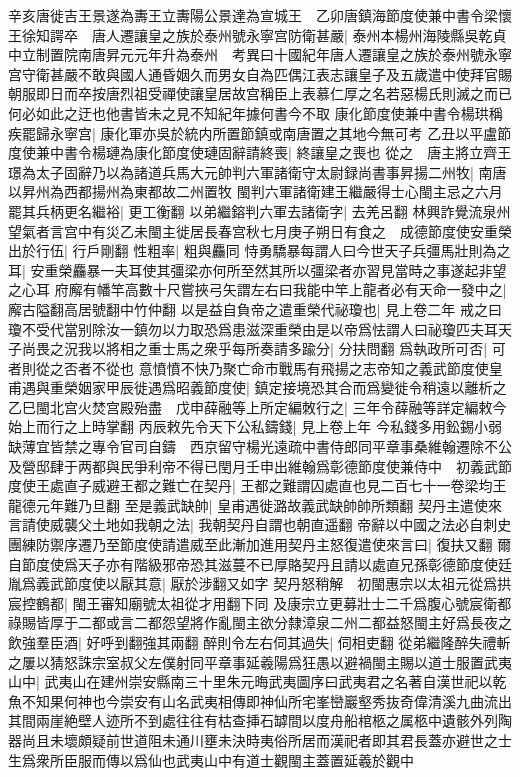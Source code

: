 辛亥唐徙吉王景遂為夀王立夀陽公景達為宣城王　乙卯唐鎮海節度使兼中書令梁懷王徐知諤卒　唐人遷讓皇之族於泰州號永寧宫防衛甚嚴|{
	泰州本楊州海陵縣吳乾貞中立制置院南唐昇元元年升為泰州　考異曰十國紀年唐人遷讓皇之族於泰州號永寧宫守衛甚嚴不敢與國人通昏姻久而男女自為匹偶江表志讓皇子及五歲遣中使拜官賜朝服即日而卒按唐烈祖受禪使讓皇居故宫稱臣上表慕仁厚之名若惡楊氏則滅之而已何必如此之迂也他書皆未之見不知紀年據何書今不取}
康化節度使兼中書令楊珙稱疾罷歸永寧宫|{
	康化軍亦吳於統内所置節鎮或南唐置之其地今無可考}
乙丑以平盧節度使兼中書令楊璉為康化節度使璉固辭請終喪|{
	終讓皇之喪也}
從之　唐主將立齊王璟為太子固辭乃以為諸道兵馬大元帥判六軍諸衛守太尉録尚書事昇揚二州牧|{
	南唐以昇州為西都揚州為東都故二州置牧}
閩判六軍諸衛建王繼嚴得士心閩主忌之六月罷其兵柄更名繼裕|{
	更工衡翻}
以弟繼鎔判六軍去諸衛字|{
	去羌呂翻}
林興詐覺流泉州望氣者言宫中有災乙未閩主徙居長春宫秋七月庚子朔日有食之　成德節度使安重榮出於行伍|{
	行戶剛翻}
性粗率|{
	粗與麤同}
恃勇驕暴每謂人曰今世天子兵彊馬壯則為之耳|{
	安重榮麤暴一夫耳使其彊梁亦何所至然其所以彊梁者亦習見當時之事遂起非望之心耳}
府廨有幡竿高數十尺嘗挾弓矢謂左右曰我能中竿上龍者必有天命一發中之|{
	廨古隘翻高居號翻中竹仲翻}
以是益自負帝之遣重榮代祕瓊也|{
	見上卷二年}
戒之曰瓊不受代當别除汝一鎮勿以力取恐爲患滋深重榮由是以帝爲怯謂人曰祕瓊匹夫耳天子尚畏之況我以將相之重士馬之衆乎每所奏請多踰分|{
	分扶問翻}
爲執政所可否|{
	可者則從之否者不從也}
意憤憤不快乃聚亡命市戰馬有飛揚之志帝知之義武節度使皇甫遇與重榮姻家甲辰徙遇爲昭義節度使|{
	鎮定接境恐其合而爲變徙令稍遠以離析之}
乙巳閩北宫火焚宫殿殆盡　戊申薛融等上所定編敇行之|{
	三年令薛融等詳定編敕今始上而行之上時掌翻}
丙辰敕先令天下公私鑄錢|{
	見上卷上年}
今私錢多用鈆錫小弱缺薄宜皆禁之專令官司自鑄　西京留守楊光遠疏中書侍郎同平章事桑維翰遷除不公及營邸肆于两都與民爭利帝不得已閏月壬申出維翰爲彰德節度使兼侍中　初義武節度使王處直子威避王都之難亡在契丹|{
	王都之難謂囚處直也見二百七十一卷梁均王龍德元年難乃旦翻}
至是義武缺帥|{
	皇甫遇徙潞故義武缺帥帥所類翻}
契丹主遣使來言請使威襲父土地如我朝之法|{
	我朝契丹自謂也朝直遥翻}
帝辭以中國之法必自刺史團練防禦序遷乃至節度使請遣威至此漸加進用契丹主怒復遣使來言曰|{
	復扶又翻}
爾自節度使爲天子亦有階級邪帝恐其滋蔓不已厚賂契丹且請以處直兄孫彰德節度使廷胤爲義武節度使以厭其意|{
	厭於涉翻又如字}
契丹怒稍解　初閩惠宗以太祖元從爲拱宸控鶴都|{
	閩王審知廟號太祖從才用翻下同}
及康宗立更募壯士二千爲腹心號宸衛都祿賜皆厚于二都或言二都怨望將作亂閩主欲分隸漳泉二州二都益怒閩主好爲長夜之飲強羣臣酒|{
	好呼到翻強其兩翻}
醉則令左右伺其過失|{
	伺相吏翻}
從弟繼隆醉失禮斬之屢以猜怒誅宗室叔父左僕射同平章事延羲陽爲狂愚以避禍閩主賜以道士服置武夷山中|{
	武夷山在建州崇安縣南三十里朱元晦武夷圖序曰武夷君之名著自漢世祀以乾魚不知果何神也今崇安有山名武夷相傳即神仙所宅峯巒巖壑秀抜奇偉清溪九曲流出其間兩崖絶壁人迹所不到處往往有枯查挿石罅間以度舟船棺柩之属柩中遺骸外列陶器尚且未壞頗疑前世道阻未通川壅未決時夷俗所居而漢祀者即其君長蓋亦避世之士生爲衆所臣服而傳以爲仙也武夷山中有道士觀閩主蓋置延羲於觀中}
